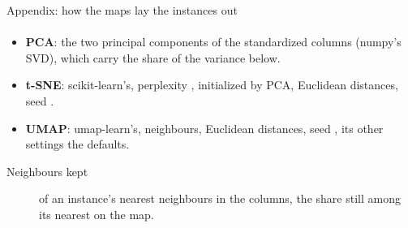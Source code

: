 \begin{frame}{Appendix: how the maps lay the instances out}
  \framesubtitle{\isquestion}
  \scriptsize
  \begin{itemize}
    \item[] \textbf{PCA}: the two principal components of the standardized columns (numpy's SVD),
      which carry the share of the variance below.
    \item[] \textbf{t-SNE}: scikit-learn's, perplexity \isPerplexity, initialized by PCA, Euclidean
      distances, seed \isSeed.
    \item[] \textbf{UMAP}: umap-learn's, \isUmapNeighbours{} neighbours, Euclidean distances, seed
      \isSeed, its other settings the defaults.
  \end{itemize}
  \vskip 2mm
  \centering
  \setlength{\tabcolsep}{4pt}
  \def\arraystretch{1.5}
  
  \par 
  \vskip 2mm
  \begin{description}
    \item [Neighbours kept] of an instance's \isKeep{} nearest neighbours in the columns, the share still among its \isKeep{} nearest on the map.
  \end{description}
\end{frame}
